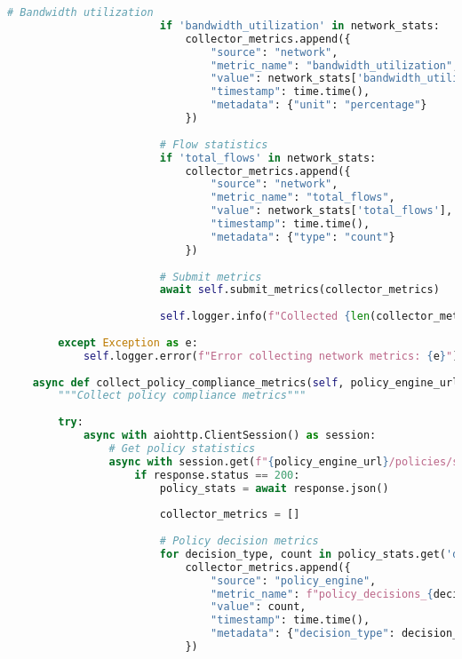 \begin{lstlisting}[language=python, caption=Custom Metrics Collector]
                        # Bandwidth utilization
                        if 'bandwidth_utilization' in network_stats:
                            collector_metrics.append({
                                "source": "network",
                                "metric_name": "bandwidth_utilization",
                                "value": network_stats['bandwidth_utilization'],
                                "timestamp": time.time(),
                                "metadata": {"unit": "percentage"}
                            })
                        
                        # Flow statistics
                        if 'total_flows' in network_stats:
                            collector_metrics.append({
                                "source": "network",
                                "metric_name": "total_flows",
                                "value": network_stats['total_flows'],
                                "timestamp": time.time(),
                                "metadata": {"type": "count"}
                            })
                        
                        # Submit metrics
                        await self.submit_metrics(collector_metrics)
                        
                        self.logger.info(f"Collected {len(collector_metrics)} network metrics")
        
        except Exception as e:
            self.logger.error(f"Error collecting network metrics: {e}")
    
    async def collect_policy_compliance_metrics(self, policy_engine_url: str):
        """Collect policy compliance metrics"""
        
        try:
            async with aiohttp.ClientSession() as session:
                # Get policy statistics
                async with session.get(f"{policy_engine_url}/policies/stats") as response:
                    if response.status == 200:
                        policy_stats = await response.json()
                        
                        collector_metrics = []
                        
                        # Policy decision metrics
                        for decision_type, count in policy_stats.get('decisions', {}).items():
                            collector_metrics.append({
                                "source": "policy_engine",
                                "metric_name": f"policy_decisions_{decision_type}",
                                "value": count,
                                "timestamp": time.time(),
                                "metadata": {"decision_type": decision_type}
                            })
                        

\end{lstlisting}
